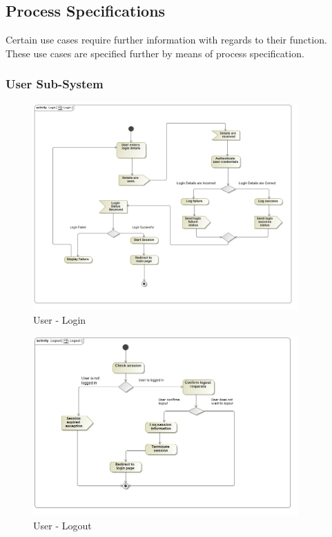 \documentclass{article}
\begin{document}
		\cleardoublepage	
		\subsection{Process Specifications}\label{subsec:processspecification}
		Certain use cases require further information with regards to their function.\\ These use cases are specified further by means of process specification.
		\subsubsection{User Sub-System}
			\begin{figure}[H]
				\includegraphics[width=4in, center]{../Diagrams/Process Specifications/User subsystem/Login.jpg}
				\caption{User - Login}
			\end{figure}
			\begin{figure}[H]
				\includegraphics[width=4in, center]{../Diagrams/Process Specifications/User subsystem/Logout.jpg}
				\caption{User - Logout}
			\end{figure}
\end{document}
